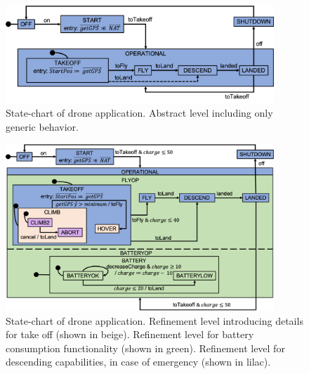 \begin{figure}[]
	\vspace{-.4cm}
	\centering
	\includegraphics[width=0.90\textwidth, trim=0 40 0 0]{figures/Picture1.png}
	\caption{State-chart of drone application. Abstract level including only generic behavior. }
	\label{fig:drone1}
	\vspace{-.4cm}
\end{figure} 



\begin{figure}[]
	\centering
	\includegraphics[width=0.90\textwidth, trim=0 30 0 0]{figures/Picture5.png}
	\caption{State-chart of drone application. Refinement level introducing details for take off (shown in beige).
	Refinement level for battery consumption functionality (shown in green).
	Refinement level for descending capabilities, in case of emergency (shown in lilac).}
	\label{fig:drone4}
\end{figure} 

